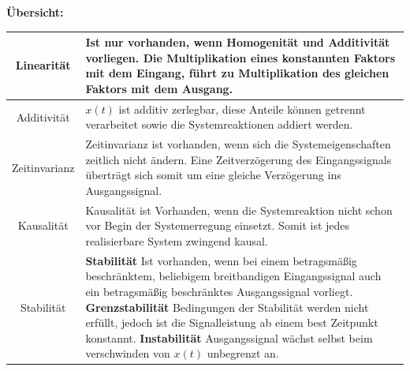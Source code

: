 \textbf{Übersicht:}
\newline
\begin{tabularx}{\textwidth}{|c|X|}\hline
	Linearität	& Ist nur vorhanden, wenn Homogenität und Additivität vorliegen. \newline Die
	Multiplikation eines konstannten Faktors mit dem Eingang, führt zu Multiplikation des
	gleichen Faktors mit dem Ausgang.\\\hline
	
	Additivität & \(x\left(t\right)\) ist additiv zerlegbar, diese Anteile können getrennt verarbeitet
	sowie die Systemreaktionen addiert werden.\\\hline
	
	Zeitinvarianz & Zeitinvarianz ist vorhanden, wenn sich die Systemeigenschaften zeitlich nicht
	ändern. \newline Eine Zeitverzögerung des Eingangssignals überträgt sich somit um eine gleiche
	Verzögerung ins Ausgangssignal.\\\hline
	
	Kausalität & Kausalität ist Vorhanden, wenn die Systemreaktion nicht schon vor Begin der
	Systemerregung einsetzt. \newline Somit ist jedes realisierbare System zwingend kausal.\\\hline
	
	Stabilität & 	\textbf{Stabilität} \newline
					Ist vorhanden, wenn bei einem betragsmäßig beschränktem, beliebigem breitbandigen
					Eingangssignal auch ein betragsmäßig beschränktes Ausgangssignal vorliegt.
					\newline \textbf{Grenzstabilität} \newline
					Bedingungen der Stabilität werden nicht erfüllt, jedoch ist die Signalleistung ab einem best
					Zeitpunkt konstannt. 
					\newline \textbf{Instabilität} \newline
					Ausgangssignal wächst selbst beim verschwinden von \(x\left(t\right)\) unbegrenzt an.
					\\\hline		
\end{tabularx}

\newpage
